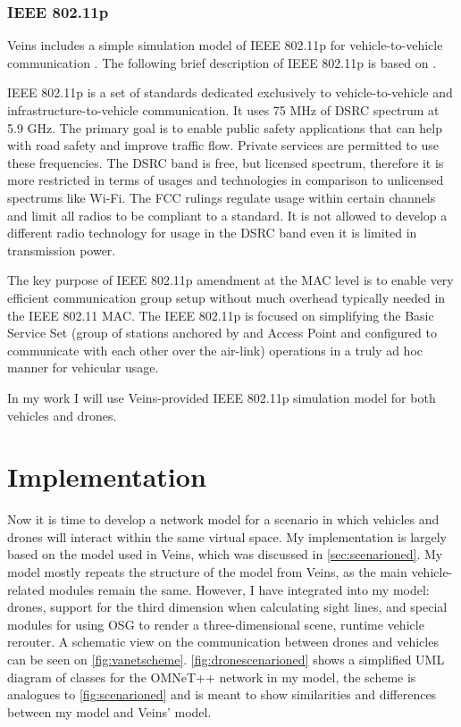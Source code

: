 \documentclass[]{nsm-thesis}
\begin{document}
\subsection{IEEE 802.11p}
Veins includes a simple simulation model of IEEE 802.11p for vehicle-to-vehicle communication \cite[Page~216]{Sommer2019}. The following brief description of IEEE 802.11p is based on \textcite{jiang2008ieee}.

IEEE 802.11p is a set of standards dedicated exclusively to vehicle-to-vehicle and infrastructure-to-vehicle communication. It uses 75 MHz of \ac{DSRC} spectrum at 5.9 GHz. The primary goal is to enable public safety applications that can help with road safety and improve traffic flow. Private services are permitted to use these frequencies. The \ac{DSRC} band is free, but licensed spectrum, therefore it is more restricted in terms of usages and technologies in comparison to unlicensed spectrums like Wi-Fi. The \ac{FCC} rulings regulate usage within certain channels and limit all radios to be compliant to a standard. It is not allowed to develop a different radio technology for usage in the \ac{DSRC} band even it is limited in transmission power.

The key purpose of IEEE 802.11p amendment at the MAC level is to enable very efficient communication group setup without much overhead typically needed in the IEEE 802.11 MAC. The IEEE 802.11p is focused on simplifying the Basic Service Set (group of stations anchored by and Access Point and configured to communicate with each other over the air-link) operations in a truly ad hoc manner for vehicular usage.

In my work I will use Veins-provided IEEE 802.11p simulation model for both vehicles and drones.



\chapter{Implementation}

Now it is time to develop a network model for a scenario in which vehicles and drones will interact within the same virtual space. My implementation is largely based on the model used in Veins, which was discussed in \cref{sec:scenarioned}. My model mostly repeats the structure of the model from Veins, as the main vehicle-related modules remain the same. However, I have integrated into my model: drones, support for the third dimension when calculating sight lines, and special modules for using OSG to render a three-dimensional scene, runtime vehicle rerouter. A schematic view on the communication between drones and vehicles can be seen on \cref{fig:vanetscheme}. \cref{fig:dronescenarioned} shows a simplified UML diagram of classes for the OMNeT++ network in my model, the scheme is analogues to \cref{fig:scenarioned} and is meant to show similarities and differences between my model and Veins' model.
\end{document}
